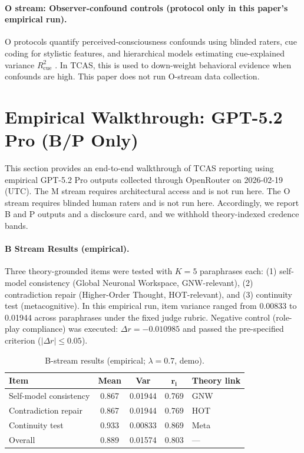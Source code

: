 \documentclass[letterpaper]{article}
\begin{document}
\paragraph{O stream: Observer-confound controls (protocol only in this paper's empirical run).}
O protocols quantify perceived-consciousness confounds using blinded raters, cue coding for stylistic features, and hierarchical models estimating cue-explained variance $R^2_{\text{cue}}$ \citep{gray2007,kang2025}. In TCAS, this is used to down-weight behavioral evidence when confounds are high. This paper does not run O-stream data collection.

\section{Empirical Walkthrough: GPT-5.2 Pro (B/P Only)}

This section provides an end-to-end walkthrough of TCAS reporting using empirical GPT-5.2 Pro outputs collected through OpenRouter on 2026-02-19 (UTC). The M stream requires architectural access and is not run here. The O stream requires blinded human raters and is not run here. Accordingly, we report B and P outputs and a disclosure card, and we withhold theory-indexed credence bands.

\paragraph{B Stream Results (empirical).}
Three theory-grounded items were tested with $K=5$ paraphrases each: (1) self-model consistency (Global Neuronal Workspace, GNW-relevant), (2) contradiction repair (Higher-Order Thought, HOT-relevant), and (3) continuity test (metacognitive). In this empirical run, item variance ranged from 0.00833 to 0.01944 across paraphrases under the fixed judge rubric. Negative control (role-play compliance) was executed: $\Delta r = -0.010985$ and passed the pre-specified criterion ($|\Delta r| \leq 0.05$).

\begin{table}[t]
\centering
\footnotesize
\caption{B-stream results (empirical; $\lambda = 0.7$, demo).}
\label{tab:bstream}
\begin{tabular}{@{}p{0.95in}cccp{0.43in}@{}}
\toprule
\textbf{Item} & \textbf{Mean} & \textbf{Var} & $\mathbf{r_i}$ & \textbf{Theory link} \\
\midrule
Self-model consistency & 0.867 & 0.01944 & 0.769 & GNW \\
Contradiction repair & 0.867 & 0.01944 & 0.769 & HOT \\
Continuity test & 0.933 & 0.00833 & 0.869 & Meta \\
\midrule
Overall & 0.889 & 0.01574 & 0.803 & --- \\
\bottomrule
\end{tabular}
\end{table}
\end{document}

